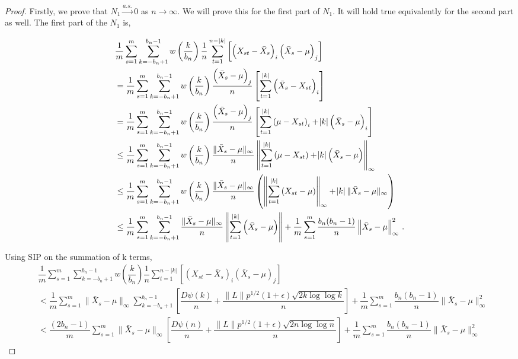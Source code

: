 \documentclass[12pt]{article}
\theoremstyle{remark}
\begin{document}
\begin{proof}
Firstly, we prove that  $N_1 \xrightarrow{a.s.} 0$ as $n \to \infty$. We will prove this for the first part of $N_1$. It will hold true equivalently for the second part as well. The first part of the $N_1$ is,


\begin{align*}
    & \dfrac{1}{m}\sum_{s=1}^{m}\sum_{k=-b_n+1}^{b_n-1}w\left(\dfrac{k}{b_n}\right)\dfrac{1}{n}\sum_{t=1}^{n-|k|}\left[ \left(X_{st} - \bar{X}_s \right)_i  \left(\bar{X}_s - \mu \right)_j \right]\\
    & = \dfrac{1}{m}\sum_{s=1}^{m}\sum_{k=-b_n+1}^{b_n-1}w\left(\dfrac{k}{b_n}\right)\dfrac{  \left(\bar{X}_s - \mu \right)_j}{n} \left[\sum\limits_{t=1}^{|k|} \left(\bar{X}_s - X_{st} \right)_i\right]\\
    & = \dfrac{1}{m}\sum_{s=1}^{m}\sum_{k=-b_n+1}^{b_n-1} w\left(\dfrac{k}{b_n}\right) \dfrac{\left(\bar{X}_s - \mu \right)_j}{n} \left[\sum_{t=1}^{|k|} \left(\mu - X_{st} \right)_i + \abs{k} \left(\bar{X}_s - \mu \right)_i\right]\\
    & \leq \dfrac{1}{m}\sum_{s=1}^{m}\sum_{k=-b_n+1}^{b_n-1}w\left(\dfrac{k}{b_n}\right)\dfrac{\|\bar{X}_s - \mu\|_{\infty}}{n} \left\|\sum_{t=1}^{|k|} \left(\mu - X_{st} \right) + \abs{k} \left(\bar{X}_s - \mu \right)\right\|_{\infty}\\
    & \leq \dfrac{1}{m}\sum_{s=1}^{m}\sum_{k=-b_n+1}^{b_n-1}w\left(\dfrac{k}{b_n}\right)\dfrac{\|\bar{X}_s - \mu\|_{\infty}}{n} \left(\left\|\sum_{t=1}^{|k|}  \left(X_{st} - \mu \right)\right\|_{\infty} + \abs{k}\|\bar{X}_s - \mu\|_{\infty} \right)\\
    & \leq \dfrac{1}{m}\sum_{s=1}^{m}\sum_{k=-b_n+1}^{b_n-1}\dfrac{\|\bar{X}_s - \mu\|_{\infty}}{n}\left\|\sum_{t=1}^{|k|} \left(\bar{X}_s - \mu\right) \right\| + \dfrac{1}{m}\sum\limits_{s=1}^{m} \dfrac{b_n(b_n-1)}{n} \left \|\bar{X}_s - \mu \right \|_{\infty}^2\,.
\end{align*}

Using SIP on the summation of k terms,
\begin{align*}
    & \dfrac{1}{m}\sum_{s=1}^{m}\sum_{k=-b_n+1}^{b_n-1}w\left(\dfrac{k}{b_n}\right)\dfrac{1}{n}\sum_{t=1}^{n-|k|}\left[ \left(X_{st} - \bar{X}_s \right)_i  \left(\bar{X}_s - \mu \right)_j \right]\\
   &  < \dfrac{1}{m}\sum\limits_{s=1}^{m}\|\bar{X}_s - \mu\|_{\infty}\sum\limits_{k=-b_n + 1}^{b_n-1}\left[ \dfrac{D \psi(k)}{n} + \dfrac{\|L\| p^{1/2}(1+\epsilon)\sqrt{2k \log\log k}}{n}  \right] + \dfrac{1}{m}\sum\limits_{s=1}^{m} \dfrac{b_n(b_n-1)}{n}\|\bar{X}_s - \mu\|_{\infty}^2\\
   &  < \dfrac{(2b_n-1)}{m}\sum\limits_{s=1}^{m}\|\bar{X}_s - \mu\|_{\infty}\left[ \dfrac{D \psi(n)}{n} + \dfrac{\|L\| p^{1/2}(1+\epsilon)\sqrt{2n \log\log n}}{n}  \right] + \dfrac{1}{m}\sum\limits_{s=1}^{m} \dfrac{b_n(b_n-1)}{n}\|\bar{X}_s - \mu\|_{\infty}^2
\end{align*}


\end{proof}
\end{document}
